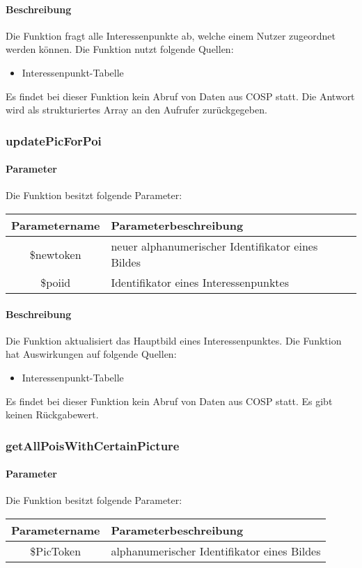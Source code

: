 \paragraph{Beschreibung} Die Funktion fragt alle Interessenpunkte ab, welche einem Nutzer zugeordnet werden können. Die Funktion nutzt folgende Quellen:
\begin{itemize}
	\item Interessenpunkt-Tabelle
\end{itemize}
Es findet bei dieser Funktion kein Abruf von Daten aus {\glqq COSP\grqq} statt. Die Antwort wird als strukturiertes Array an den Aufrufer zurückgegeben.
\subsubsection{updatePicForPoi}
\paragraph{Parameter} Die Funktion besitzt folgende Parameter:
\begin{table}[H]
	\begin{tabular}{|c|p{11cm}|}
		\hline
		\textbf{Parametername} & \textbf{Parameterbeschreibung} \\ \hline
		\$newtoken & neuer alphanumerischer Identifikator eines Bildes \\ \hline
		\$poiid    & Identifikator eines Interessenpunktes \\ \hline
	\end{tabular}
\end{table}
\paragraph{Beschreibung} Die Funktion aktualisiert das Hauptbild eines Interessenpunktes. Die Funktion hat Auswirkungen auf folgende Quellen:
\begin{itemize}
	\item Interessenpunkt-Tabelle
\end{itemize}
Es findet bei dieser Funktion kein Abruf von Daten aus {\glqq COSP\grqq} statt. Es gibt keinen Rückgabewert.
\subsubsection{getAllPoisWithCertainPicture}
\paragraph{Parameter} Die Funktion besitzt folgende Parameter:
\begin{table}[H]
	\begin{tabular}{|c|p{11cm}|}
		\hline
		\textbf{Parametername} & \textbf{Parameterbeschreibung} \\ \hline
		\$PicToken & alphanumerischer Identifikator eines Bildes \\ \hline
	\end{tabular}
\end{table}
